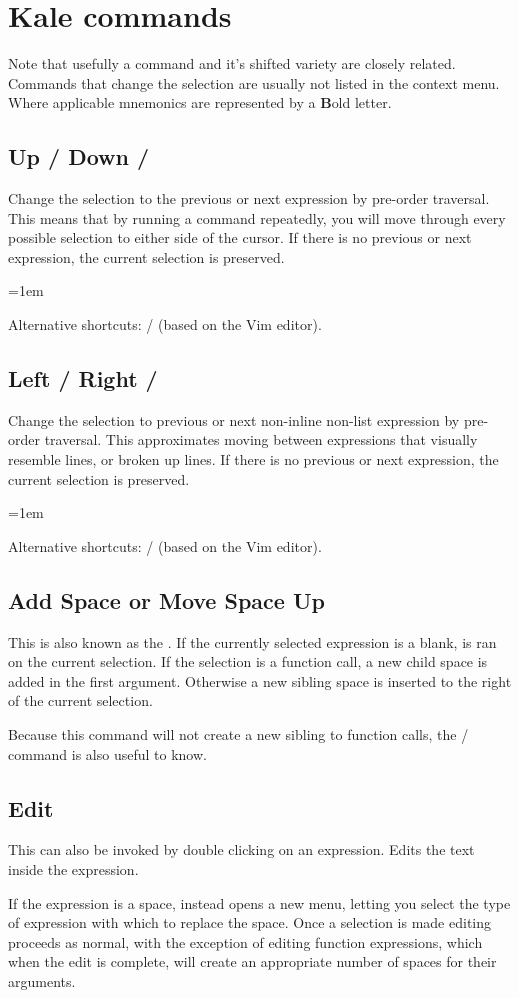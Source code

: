 \chapter{Kale commands}
\newcommand{\shortcut}[3]{\section[#1]{#1 \hfill #2}\label{cmd:#3}}
\newcommand{\pskip}[1]{{\parskip=1em\par\noindent #1}}

Note that usefully a command and it's shifted \keys{\shift} variety are closely
related. Commands that change the selection are usually not listed in the
context menu. Where applicable mnemonics are represented by a \textbf{B}old
letter.

\shortcut{Up / Down}{\ak{^} / }{up_down}
Change the selection to the previous or next expression by pre-order traversal.
This means that by running a command repeatedly, you will move through every
possible selection to either side of the cursor. If there is no previous or
next expression, the current selection is preserved.
\pskip{Alternative shortcuts:  /  (based on the Vim editor).}

\shortcut{Left / Right}{\ak{<} / \ak{>}}{left_right}
Change the selection to previous or next non-inline non-list expression by
pre-order traversal. This approximates moving between expressions that visually
resemble lines, or broken up lines. If there is no previous or next expression,
the current selection is preserved.
\pskip{Alternative shortcuts:  /  (based on the Vim editor).}

\shortcut{Add Space or Move Space Up}{\keys{\SPACE}}{smart_space}
This is also known as the . If the currently selected
expression is a blank, \hyperref[cmd:move_up]{} is ran on the
current selection. If the selection is a function call, a new child space
is added in the first argument. Otherwise a new sibling space is inserted to
the right of the current selection. 

Because this command will not create a new sibling to function calls, the 
\hyperref[cmd:new_line]{}
 /  
command is also useful to know.

\shortcut{Edit}{\keys{\return}}{edit}
This can also be invoked by double clicking on an expression. Edits the text
inside the expression.

If the expression is a space, instead opens a new menu,
letting you select the type of expression with which to replace the space. 
Once a selection is made editing proceeds as normal, with the exception of
editing function expressions, which when the edit is complete, will create
an appropriate number of spaces for their arguments.

